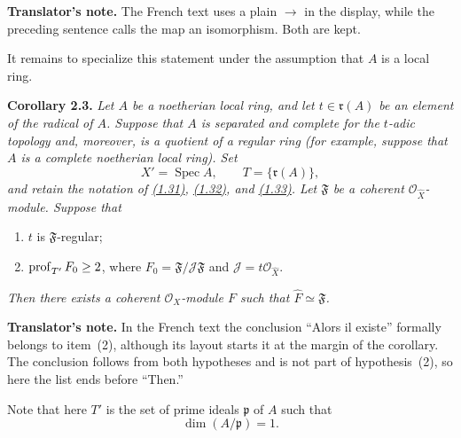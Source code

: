 \medskip
\noindent\colorbox{softgray}{\parbox{0.95\linewidth}{\footnotesize
\color{notegray}\textbf{Translator's note.}
The French text uses a plain $\to$ in the display, while the preceding
sentence calls the map an isomorphism. Both are kept.}}

\medskip
It remains to specialize this statement under the assumption that $A$ is a
local ring.

\medskip
{}\noindent\textbf{Corollary 2.3.}\quad
\emph{Let $A$ be a noetherian local ring, and let
$t\in\mathfrak r(A)$ be an element of the radical of $A$. Suppose that $A$
is separated and complete for the $t$-adic topology and, moreover, is a
quotient of a regular ring (for example, suppose that $A$ is a complete
noetherian local ring). Set}
\begin{equation}
\tag{2.9}\label{eq:IX.2.9}
X'=\operatorname{Spec}A,\qquad T=\{\mathfrak r(A)\},
\end{equation}
\emph{and retain the notation of \hyperref[eq:IX.1.31]{(1.31)}, \hyperref[eq:IX.1.32]{(1.32)}, and \hyperref[eq:IX.1.33]{(1.33)}. Let
$\mathfrak F$ be a coherent $\mathcal O_{\widehat X}$-module. Suppose that}
\begin{enumerate}
\item $t$ is $\mathfrak F$-regular;
\item $\operatorname{prof}_{T'}F_0\geq 2$, where
$F_0=\mathfrak F/\mathcal J\mathfrak F$ and
$\mathcal J=t\mathcal O_{\widehat X}$.
\end{enumerate}
\emph{Then there exists a coherent $\mathcal O_X$-module $F$ such that
$\widehat F\simeq\mathfrak F$.}

\medskip
\noindent\colorbox{softgray}{\parbox{0.95\linewidth}{\footnotesize
\color{notegray}\textbf{Translator's note.}
In the French text the conclusion ``Alors il existe'' formally belongs to
item~(2), although its layout starts it at the margin of the corollary.
The conclusion follows from both hypotheses and is not part of
hypothesis~(2), so here the list ends before ``Then.''}}

\medskip
\noindent Note that here $T'$ is the set of prime ideals $\mathfrak p$ of
$A$ such that
\[
  \dim(A/\mathfrak p)=1.
\]
